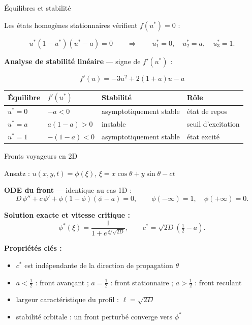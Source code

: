 \documentclass[10pt]{beamer}
\begin{document}
\begin{frame}{Équilibres et stabilité}

Les états homogènes stationnaires vérifient $f(u^*) = 0$ :

\begin{equation}
  u^*(1-u^*)(u^*-a) = 0
  \qquad \Longrightarrow \qquad
  u^*_1 = 0, \quad u^*_2 = a, \quad u^*_3 = 1.
\end{equation}

\bigskip

\textbf{Analyse de stabilité linéaire} — signe de $f'(u^*)$ :

\begin{equation}
  f'(u) = -3u^2 + 2(1+a)u - a
\end{equation}

\medskip

\begin{tabular}{@{}llll@{}}
  \toprule
  Équilibre & $f'(u^*)$ & Stabilité & Rôle \\
  \midrule
  $u^* = 0$ & $-a < 0$        & asymptotiquement stable & état de repos \\[4pt]
  $u^* = a$ & $a(1-a) > 0$    & instable                & seuil d'excitation \\[4pt]
  $u^* = 1$ & $-(1-a) < 0$    & asymptotiquement stable & état excité \\
  \bottomrule
\end{tabular}

\end{frame}


\begin{frame}{Fronts voyageurs en 2D}

Ansatz : $u(x,y,t) = \phi(\xi)$, \quad $\xi = x\cos\theta + y\sin\theta - ct$

\medskip

\textbf{ODE du front} — identique au cas 1D :
\begin{equation}
  D\,\phi'' + c\,\phi' + \phi(1-\phi)(\phi-a) = 0,
  \qquad \phi(-\infty)=1,\quad \phi(+\infty)=0.
\end{equation}

\textbf{Solution exacte et vitesse critique :}
\begin{equation}
  \phi^*(\xi) = \frac{1}{1+e^{\,\xi/\sqrt{2D}}}, \qquad
  \boxed{c^* = \sqrt{2D}\!\left(\tfrac{1}{2}-a\right).}
\end{equation}

\textbf{Propriétés clés :}

\begin{itemize}
  \item $c^*$ est indépendante de la direction de propagation $\theta$
  \item $a < \tfrac{1}{2}$ : front avançant ; \quad
        $a = \tfrac{1}{2}$ : front stationnaire ; \quad
        $a > \tfrac{1}{2}$ : front reculant
  \item largeur caractéristique du profil : $\ell = \sqrt{2D}$
  \item stabilité orbitale : un front perturbé converge vers $\phi^*$
\end{itemize}

\end{frame}
\end{document}
